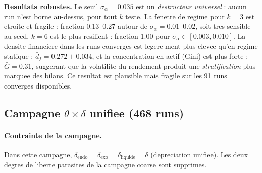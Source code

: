 \documentclass[11pt,a4paper]{article}
\begin{document}
\textbf{Resultats robustes.}
Le seuil \(\sigma_\alpha = 0.035\) est un \emph{destructeur universel} :
aucun run n'est borne au-dessus, pour tout \(k\) teste.
La fenetre de regime pour \(k=3\) est etroite et fragile : fraction 0.13--0.27
autour de \(\sigma_\alpha = 0.01\)--\(0.02\), soit tres sensible au seed.
\(k=6\) est le plus resilient : fraction 1.00 pour \(\sigma_\alpha \in [0.003, 0.010]\).
La densite financiere dans les runs converges est legere-ment plus elevee qu'en
regime statique : \(\bar{d}_f = 0.272 \pm 0.034\), et la concentration en actif
(Gini) est plus forte : \(\bar{G} = 0.31\), suggerant que la volatilite du rendement
produit une \emph{stratification} plus marquee des bilans.
Ce resultat est plausible mais fragile sur les 91 runs converges disponibles.

\subsection*{Campagne \(\theta \times \delta\) unifiee (468 runs)}

\paragraph{Contrainte de la campagne.}
Dans cette campagne, \(\delta_{\mathrm{endo}} = \delta_{\mathrm{exo}} = \delta_{\mathrm{liquide}} = \delta\)
(depreciation unifiee). Les deux degres de liberte parasites de la campagne
coarse sont supprimes.
\end{document}
